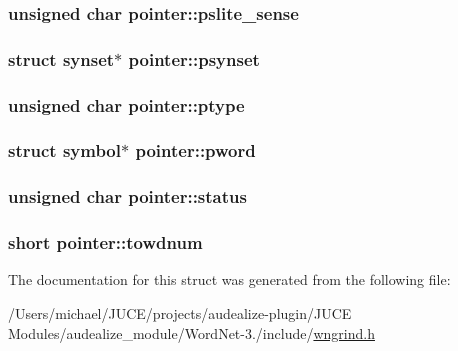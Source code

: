 \subsubsection[{\texorpdfstring{pslite\+\_\+sense}{pslite_sense}}]{\setlength{\rightskip}{0pt plus 5cm}unsigned char pointer\+::pslite\+\_\+sense}\hypertarget{structpointer_a1f1b809e01cb5b8a3e173daad25c618b}{}\label{structpointer_a1f1b809e01cb5b8a3e173daad25c618b}
\subsubsection[{\texorpdfstring{psynset}{psynset}}]{\setlength{\rightskip}{0pt plus 5cm}struct {\bf synset}$\ast$ pointer\+::psynset}\hypertarget{structpointer_ae01149051e6e0c9bf23af66a344e75c4}{}\label{structpointer_ae01149051e6e0c9bf23af66a344e75c4}
\subsubsection[{\texorpdfstring{ptype}{ptype}}]{\setlength{\rightskip}{0pt plus 5cm}unsigned char pointer\+::ptype}\hypertarget{structpointer_a0a439e7d33e942b0fe6a83d69b3f3692}{}\label{structpointer_a0a439e7d33e942b0fe6a83d69b3f3692}
\subsubsection[{\texorpdfstring{pword}{pword}}]{\setlength{\rightskip}{0pt plus 5cm}struct {\bf symbol}$\ast$ pointer\+::pword}\hypertarget{structpointer_a1e80a677e0a813fedff45f1a74698ffa}{}\label{structpointer_a1e80a677e0a813fedff45f1a74698ffa}
\subsubsection[{\texorpdfstring{status}{status}}]{\setlength{\rightskip}{0pt plus 5cm}unsigned char pointer\+::status}\hypertarget{structpointer_aabc225612d909de56a62ed8fd17df4da}{}\label{structpointer_aabc225612d909de56a62ed8fd17df4da}
\subsubsection[{\texorpdfstring{towdnum}{towdnum}}]{\setlength{\rightskip}{0pt plus 5cm}short pointer\+::towdnum}\hypertarget{structpointer_ad23ff477ec4f2bb93594e8c5b295a573}{}\label{structpointer_ad23ff477ec4f2bb93594e8c5b295a573}


The documentation for this struct was generated from the following file\+:\begin{DoxyCompactItemize}
\item 
/\+Users/michael/\+J\+U\+C\+E/projects/audealize-\/plugin/\+J\+U\+C\+E Modules/audealize\+\_\+module/\+Word\+Net-\/3./include/\hyperlink{wngrind_8h}{wngrind.\+h}\end{DoxyCompactItemize}
